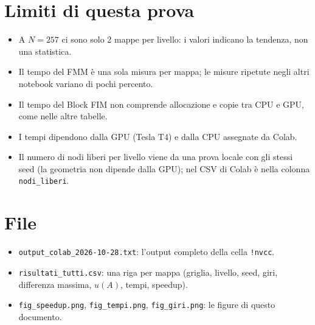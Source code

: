 \documentclass[11pt,a4paper]{article}
\begin{document}
\section{Limiti di questa prova}
\begin{itemize}
  \item A $N=257$ ci sono solo 2 mappe per livello: i valori indicano la tendenza, non una statistica.
  \item Il tempo del FMM è una sola misura per mappa; le misure ripetute negli altri notebook variano di pochi percento.
  \item Il tempo del Block FIM non comprende allocazione e copie tra CPU e GPU, come nelle altre tabelle.
  \item I tempi dipendono dalla GPU (Tesla T4) e dalla CPU assegnate da Colab.
  \item Il numero di nodi liberi per livello viene da una prova locale con gli stessi seed (la geometria non dipende dalla GPU); nel CSV di Colab è nella colonna
  \texttt{nodi\_liberi}.
\end{itemize}

\section{File}
\begin{itemize}
  \item \texttt{output\_colab\_2026-10-28.txt}: l'output completo della cella \texttt{!nvcc}.
  \item \texttt{risultati\_tutti.csv}: una riga per mappa (griglia, livello, seed, giri, differenza massima, $u(A)$, tempi, speedup).
  \item \texttt{fig\_speedup.png}, \texttt{fig\_tempi.png}, \texttt{fig\_giri.png}: le figure di questo documento.
\end{itemize}
\end{document}
